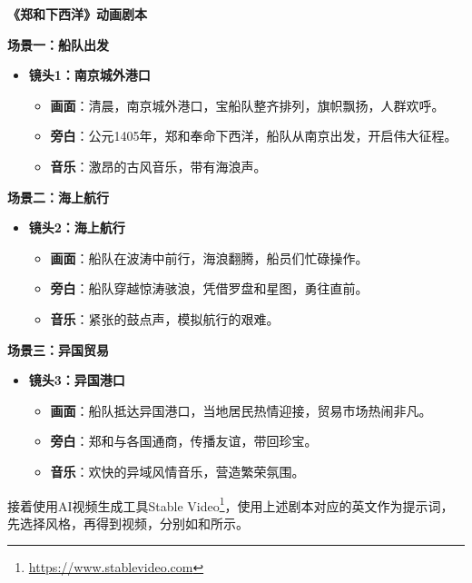 \begin{gptbox}
\small{
  \textbf{《郑和下西洋》动画剧本}

  \textbf{场景一：船队出发}
  \begin{itemize}
      \item \textbf{镜头1：南京城外港口}
      \begin{itemize}
          \item \textbf{画面}：清晨，南京城外港口，宝船队整齐排列，旗帜飘扬，人群欢呼。
          \item \textbf{旁白}：公元1405年，郑和奉命下西洋，船队从南京出发，开启伟大征程。
          \item \textbf{音乐}：激昂的古风音乐，带有海浪声。
      \end{itemize}
  \end{itemize}
  
  \textbf{场景二：海上航行}
  \begin{itemize}
      \item \textbf{镜头2：海上航行}
      \begin{itemize}
          \item \textbf{画面}：船队在波涛中前行，海浪翻腾，船员们忙碌操作。
          \item \textbf{旁白}：船队穿越惊涛骇浪，凭借罗盘和星图，勇往直前。
          \item \textbf{音乐}：紧张的鼓点声，模拟航行的艰难。
      \end{itemize}
  \end{itemize}
  
  \textbf{场景三：异国贸易}
  \begin{itemize}
      \item \textbf{镜头3：异国港口}
      \begin{itemize}
          \item \textbf{画面}：船队抵达异国港口，当地居民热情迎接，贸易市场热闹非凡。
          \item \textbf{旁白}：郑和与各国通商，传播友谊，带回珍宝。
          \item \textbf{音乐}：欢快的异域风情音乐，营造繁荣氛围。
      \end{itemize}
  \end{itemize}

}
\end{gptbox}

接着使用AI视频生成工具Stable Video\footnote{\url{https://www.stablevideo.com}}，使用上述剧本对应的英文作为提示词，先选择风格，再得到视频，分别如和所示。

